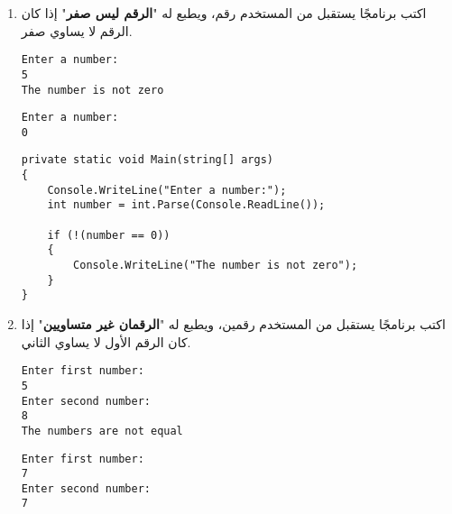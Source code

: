 \documentclass[12pt, twoside]{article}
\begin{document}
\begin{enumerate}[itemsep=3em]
\begin{enumerate}
\item
اكتب برنامجًا يستقبل من المستخدم رقم، ويطبع له "\textbf{الرقم ليس صفر}" إذا كان الرقم لا يساوي صفر.
\ifdetailed
\begin{example}[1]
\begin{english}
\begin{verbatim}
Enter a number:
5
The number is not zero
\end{verbatim}
\end{english}
\end{example}
\begin{example}[2]
\begin{english}
\begin{verbatim}
Enter a number:
0
\end{verbatim}
\end{english}
\end{example}

\ifwithsols
\begin{solution}
\begin{english}
\begin{verbatim}
private static void Main(string[] args)
{
    Console.WriteLine("Enter a number:");
    int number = int.Parse(Console.ReadLine());

    if (!(number == 0))
    {
        Console.WriteLine("The number is not zero");
    }
}
\end{verbatim}
\end{english}
\end{solution}
\clearpage
\fi
\fi

\item
اكتب برنامجًا يستقبل من المستخدم رقمين، ويطبع له "\textbf{الرقمان غير متساويين}" إذا كان الرقم الأول لا يساوي الثاني.
\ifdetailed
\begin{example}[1]
\begin{english}
\begin{verbatim}
Enter first number:
5
Enter second number:
8
The numbers are not equal
\end{verbatim}
\end{english}
\end{example}
\begin{example}[2]
\begin{english}
\begin{verbatim}
Enter first number:
7
Enter second number:
7
\end{verbatim}
\end{english}
\end{example}


\end{enumerate}
\end{enumerate}
\end{document}
